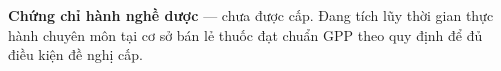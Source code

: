 \vspace{6mm}
{\paragraphstyle   %
\begin{cvitems}
  \item {\textbf{Chứng chỉ hành nghề dược} --- chưa được cấp. Đang tích lũy thời gian
         thực hành chuyên môn tại cơ sở bán lẻ thuốc đạt chuẩn GPP theo quy định để đủ
         điều kiện đề nghị cấp.}
\end{cvitems}
}
